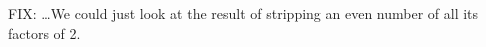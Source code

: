 \documentclass[12pt]{article}
\begin{document}
    FIX: \dots We could just look at the result of stripping an even number of all its factors of 2. \\
    \begin{comment}
    \begin{lemma}
        $(4, 12k + 6, 2) \to \infty$
    \end{lemma}
    \begin{proof}
        $1, 10 + 12k, 5 + 6k, 26 + 36k, 13 + 18k, 58 + 84k, 29 + 42k, 122 + 180k, 61 + 90k, 250 + 372k, 125 + 186k, 256 + 384k, 128 + 192k,\dots$ \\
        $1, \\
        2(5 + 6k), 5 + 6k, \\
        2(13 + 18k), 13 + 18k, \\
        2(29 + 42k), 29 + 42k, \\
        2(61 + 90k), 61 + 90k, \\
        2(125 + 186k), 125 + 186k, \\
        2(128 + 192k), 128 + 192k,
        \dots$ \\

        $5 + 6k, 5 + 6k + (8 + 12k), 5 + 6k + (8 + 12k) + 2(8 + 12k),\dots$ \\
        $\mseti{2\bs(5 + 6k + \ell(8 + 12k)\bs)}{\ell}{0}$ and $\mseti{5 + 6k + \ell(8 + 12k)}{\ell}{0}$ \\

        $3, 18 + 12k, 9 + 6k, 42 + 36k, 21 + 18k, 90 + 84k, 45 + 42k, 186 + 180k, 93 + 90k, 
        378 + 372k, 189 + 186k, 
        762 + 756k, 381 + 378k, 
        1530 + 1524k, 765 + 762k, 
        3066 + 3060k, 1533 + 1530k,\dots \\
        3(1), \\
        6(3 + 2k), 3(3 + 2k), \\
        6(7 + 6k), 3(7 + 6k), \\
        6(15 + 14k), 3(15 + 14k), \\
        6(31 + 30k), 3(31 + 30k), \\
        6(63 + 62k), 3(63 + 62k), \\
        6(127 + 125k), 3(127 + 125k), \\
        6(255 + 253k), 3(255 + 253k), \\
        6(511 + 509k), 3(511 + 509k),
        \dots$ \\

        $3 + 2k, 3 + 2k + (4 + 4k), 3 + 2k + 2(4 + 4k),\dots$ \\
        $\mseti{6(3 + 2k + \ell(4 + 4k))}{\ell}{0}$ and $\mseti{3(3 + 2k + \ell(4 + 4k))}{\ell}{0}$ \\


\end{comment}
\end{document}
